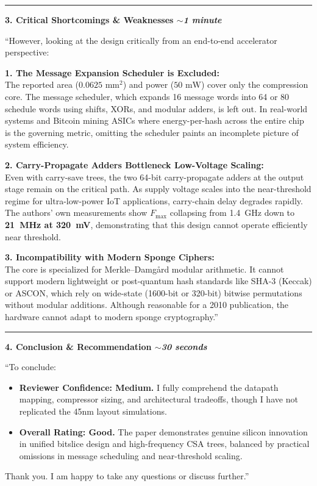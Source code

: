 \documentclass[11pt,a4paper]{article}
\begin{document}
\vspace{0.7em}
\hrule
\vspace{0.5em}

{\large\bfseries\color{iiscblue} 3. Critical Shortcomings \& Weaknesses \hfill \normalfont\small\itshape $\sim$1 minute}

\vspace{0.2em}
``However, looking at the design critically from an end-to-end accelerator perspective:

\textbf{1. The Message Expansion Scheduler is Excluded:} \\
The reported area ($0.0625\text{ mm}^2$) and power ($50\text{ mW}$) cover only the compression core. The message scheduler, which expands 16 message words into 64 or 80 schedule words using shifts, XORs, and modular adders, is left out. In real-world systems and Bitcoin mining ASICs where energy-per-hash across the entire chip is the governing metric, omitting the scheduler paints an incomplete picture of system efficiency.

\textbf{2. Carry-Propagate Adders Bottleneck Low-Voltage Scaling:} \\
Even with carry-save trees, the two 64-bit carry-propagate adders at the output stage remain on the critical path. As supply voltage scales into the near-threshold regime for ultra-low-power IoT applications, carry-chain delay degrades rapidly. The authors' own measurements show $F_{\max}$ collapsing from 1.4~GHz down to \textbf{21~MHz at 320~mV}, demonstrating that this design cannot operate efficiently near threshold.

\textbf{3. Incompatibility with Modern Sponge Ciphers:} \\
The core is specialized for Merkle--Damg{\aa}rd modular arithmetic. It cannot support modern lightweight or post-quantum hash standards like SHA-3 (Keccak) or ASCON, which rely on wide-state (1600-bit or 320-bit) bitwise permutations without modular additions. Although reasonable for a 2010 publication, the hardware cannot adapt to modern sponge cryptography.''

\vspace{0.7em}
\hrule
\vspace{0.5em}

{\large\bfseries\color{iiscblue} 4. Conclusion \& Recommendation \hfill \normalfont\small\itshape $\sim$30 seconds}

\vspace{0.2em}
``To conclude:
\begin{itemize}[leftmargin=1.5em, itemsep=2pt]
    \item \textbf{Reviewer Confidence: Medium.} I fully comprehend the datapath mapping, compressor sizing, and architectural tradeoffs, though I have not replicated the 45nm layout simulations.
    \item \textbf{Overall Rating: Good.} The paper demonstrates genuine silicon innovation in unified bitslice design and high-frequency CSA trees, balanced by practical omissions in message scheduling and near-threshold scaling.
\end{itemize}
Thank you. I am happy to take any questions or discuss further.''
\end{document}
